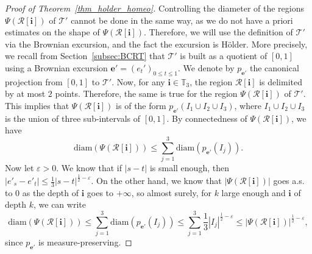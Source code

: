 \documentclass[11pt]{article}
\newcommand{\Tt}{\mathcal{T}}
\newcommand{\Rr}{\mathcal{R}}
\newcommand{\ii}{\mathbf{i}}
\newcommand{\diam}{\mathrm{diam}}
\let\eps\varepsilon
\theoremstyle{plain}
\theoremstyle{definition}
\numberwithin{equation}{section}
\begin{document}
\begin{proof}[Proof of Theorem~\ref{thm_holder_homeo}]
Controlling the diameter of the regions $\Psi \left( \Rr[\ii]\right)$ of $\Tt'$ cannot be done in the same way, as we do not have a priori estimates on the shape of $\Psi \left( \Rr[\ii]\right)$. Therefore, we will use the definition of $\Tt'$ via the Brownian excursion, and the fact the excursion is Hölder.
More precisely, we recall from Section~\ref{subsec:BCRT} that $\Tt'$ is built as a quotient of $[0,1]$ using a Brownian excursion $\mathbf{e}'=\left( e_t' \right)_{0 \leq t \leq 1}$. We denote by $p_{\mathbf{e}'}$ the canonical projection from $[0,1]$ to $\Tt'$.
Now, for any $\ii \in \mathbb{T}_3$, the region $\Rr[\ii]$ is delimited by at most $2$ points.
Therefore, the same is true for the region $\Psi \left( \Rr[\ii] \right)$ of $\Tt'$.
This implies that $\Psi \left( \Rr[\ii] \right)$ is of the form $p_{\mathbf{e}'}(I_1 \cup I_2 \cup I_3)$, where $I_1 \cup I_2 \cup I_3$ is the union of three sub-intervals of $[0,1]$.
By connectedness of $\Psi \left( \Rr[\ii] \right)$, we have
\[ \diam \left( \Psi \left( \Rr[\ii] \right) \right) \leq \sum_{j=1}^3 \diam \left( p_{\mathbf{e'}}(I_j) \right). \]
Now let $\eps>0$. We know that if $|s-t|$ is small enough, then $|e'_s-e'_t| \leq \frac13 |s-t|^{\frac12-\eps}$. On the other hand, we know that $\left| \Psi \left( \Rr[\ii] \right)\right| $ goes a.s. to $0$ as the depth of $\ii$ goes to $+\infty$, so almost surely, for $k$ large enough and $\ii$ of depth $k$, we can write
\begin{equation}
\label{eq:diam of region is smaller than mass to some power}
\diam \left( \Psi \left( \Rr[\ii] \right) \right) \leq \sum_{j=1}^3 \diam \left( p_{\mathbf{e'}}(I_j) \right) \leq \sum_{j=1}^3 \frac13 |I_j|^{\frac12-\eps} \leq \left| \Psi \left( \Rr[\ii] \right) \right|^{\frac12-\eps},
\end{equation}
since $p_{\mathbf{e}'}$ is measure-preserving.


\end{proof}
\end{document}
